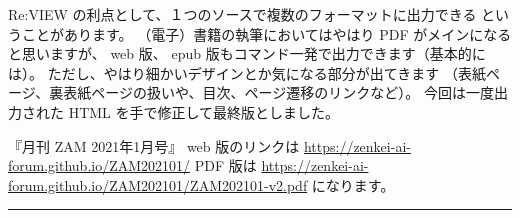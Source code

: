 \documentclass[dvipdfmx,autodetect-engine,10pt,b5paper,papersize,openany,dvipsnames]{jsbook}
\begin{document}
\begin{multicols}{2}
Re:VIEW の利点として、１つのソースで複数のフォーマットに出力できる
ということがあります。
（電子）書籍の執筆においてはやはり PDF がメインになると思いますが、
web 版、 epub 版もコマンド一発で出力できます（基本的には）。
ただし、やはり細かいデザインとか気になる部分が出てきます
（表紙ページ、裏表紙ページの扱いや、目次、ページ遷移のリンクなど）。
今回は一度出力された HTML を手で修正して最終版としました。

『月刊 ZAM 2021年1月号』 web 版のリンクは
\url{https://zenkei-ai-forum.github.io/ZAM202101/}
PDF 版は \url{https://zenkei-ai-forum.github.io/ZAM202101/ZAM202101-v2.pdf}
になります。

\end{multicols}

\hrule

\end{document}
